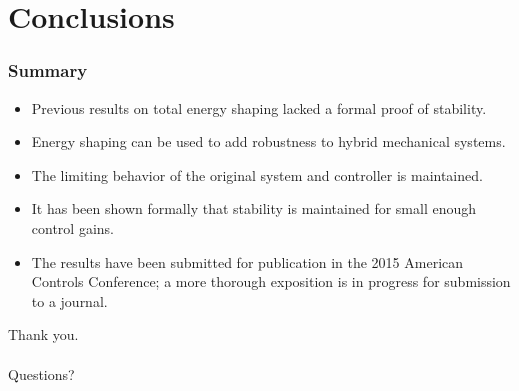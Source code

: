 \section{Conclusions}
\showtoc

\begin{frame}[t]
  \frametitle{Summary}
  \begin{itemize}
  \item Previous results on total energy shaping lacked a formal proof of
    stability.
  \item Energy shaping can be used to add robustness to hybrid mechanical
    systems.
  \item The limiting behavior of the original system and controller is
    maintained.
  \item It has been shown formally that stability is maintained for small enough
    control gains.
  \item The results have been submitted for publication in the 2015 American
    Controls Conference; a more thorough exposition is in progress for
    submission to a journal.
  \end{itemize}
\end{frame}

\begin{frame}
  \centering
  \LARGE{Thank you.}\\ \ \\
  \LARGE{Questions?}
\end{frame}
